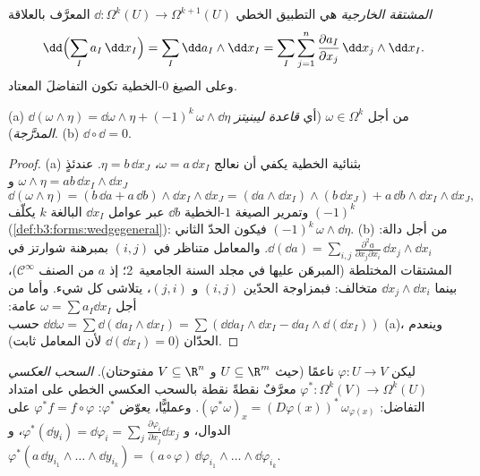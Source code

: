 \begin{definition}\label{def:b3:forms:d}
\emph{المشتقة الخارجية} هي التطبيق الخطي
$\dd\colon \Omega^k(U) \to \Omega^{k+1}(U)$ المعرَّف بالعلاقة
\[
\dd\Bigl(\sum_I a_I\,\dd x_I\Bigr)
= \sum_I \dd a_I \wedge \dd x_I
= \sum_I\sum_{j=1}^n \frac{\partial a_I}{\partial
x_j}\,\dd x_j \wedge \dd x_I .
\]
وعلى الصيغ $0$-الخطية تكون التفاضلَ المعتاد.
\end{definition}

\begin{theorem}\label{thm:b3:forms:dsquare}
(a) $\dd(\omega \wedge \eta) = \dd\omega \wedge \eta +
(-1)^k\,\omega \wedge \dd\eta$ من أجل $\omega \in \Omega^k$ (أي \emph{قاعدة ليبنيتز المدرَّجة}).
(b) $\dd \circ \dd = 0$.
\end{theorem}

\begin{proof}
(a) بثنائية الخطية يكفي أن نعالج $\omega = a\,\dd
x_I$، $\eta = b\,\dd x_J$. عندئذٍ $\omega \wedge \eta =
ab\,\dd x_I \wedge \dd x_J$
و
\[
\dd(\omega\wedge\eta) = (b\,\dd a + a\,\dd b) \wedge \dd x_I
\wedge \dd x_J
= (\dd a \wedge \dd x_I) \wedge (b\,\dd x_J) +
a\,\dd b \wedge \dd x_I \wedge \dd x_J,
\]
وتمرير الصيغة $1$-الخطية $\dd b$ عبر عوامل $\dd
x_I$ البالغة $k$
يكلّف $(-1)^k$ (\cref{def:b3:forms:wedgegeneral}): فيكون الحدّ الثاني $(-1)^k\,\omega \wedge \dd\eta$.
(b) من أجل دالة: $\dd(\dd a) = \sum_{i,j}
\frac{\partial^2a}{\partial x_j\partial x_i}\,\dd x_j \wedge
\dd x_i$. والمعامل متناظر في $(i,j)$ بمبرهنة
شوارتز في المشتقات المختلطة (المبرهَن عليها في مجلد السنة
الجامعية~2؛ إذ $a$ من الصنف $\mathcal C^\infty$)، بينما $\dd x_j \wedge
\dd x_i$ متخالف:
فبمزاوجة الحدّين $(i,j)$ و $(j,i)$، يتلاشى كل شيء. وأما من أجل
$\omega = \sum
a_I\dd x_I$ عامة: $\dd\dd\omega = \sum\dd(\dd a_I \wedge \dd x_I)
= \sum(\dd\dd a_I\wedge\dd x_I - \dd a_I\wedge\dd(\dd x_I))$ حسب (a)، وينعدم الحدّان ($\dd(\dd x_I) = 0$ لأن المعامل
ثابت).
\end{proof}

\begin{definition}\label{def:b3:forms:pullback}
ليكن $\varphi\colon U \to V$ ناعمًا (حيث $U \subseteq \R^m$ و $V \subseteq \R^n$ مفتوحتان).
\emph{السحب العكسي} $\varphi^*\colon \Omega^k(V) \to \Omega^k(U)$ معرَّفٌ نقطةً نقطة
بالسحب العكسي الخطي على امتداد التفاضل: $(\varphi^*\omega)_x = (D\varphi(x))^*\,\omega_{\varphi(x)}$. وعمليًّا،
يعوّض $\varphi^*$: $\varphi^*f = f \circ
\varphi$ على الدوال، و $\varphi^*(\dd y_i) =
\dd\varphi_i = \sum_j\frac{\partial\varphi_i}{\partial
x_j}\dd x_j$، و $\varphi^*(a\,\dd y_{i_1}\wedge\dots\wedge
\dd y_{i_k}) =
(a\circ\varphi)\,\dd\varphi_{i_1}\wedge\dots\wedge
\dd\varphi_{i_k}$.
\end{definition}

